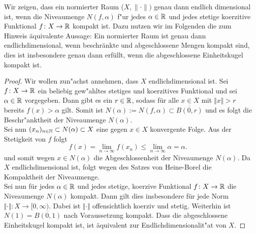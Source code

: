 
Wir zeigen, dass ein normierter Raum ($X, \lVert\cdot\rVert)$ genau dann endlich
dimensional ist, wenn die Niveaumenge
$N(f,\alpha)$ f"ur jedes $\alpha\in\mathbb{R}$ und
jedes stetige koerzitive Funktional
$f\colon X\to\mathbb{R}$ kompakt ist. Dazu
nutzen wir im Folgenden die zum Hinweis äquivalente Aussage: Ein normierter Raum ist genau dann endlichdimensional, wenn beschränkte und abgeschlossene Mengen kompakt sind,
dies ist insbesondere genau dann erfüllt, wenn die abgeschlossene Einheitskugel kompakt ist.

\begin{proof}
Wir wollen zun"achst annehmen, dass $X$ endlichdimensional ist. Sei $f\colon X\to\mathbb{R}$
ein beliebig gew"ahltes stetiges und koerzitives Funktional und sei $\alpha\in\mathbb{R}$
vorgegeben.
 Dann gibt es ein
 $r\in\mathbb{R}$, sodass für alle $x\in X$ mit $\Vert x\Vert>r$ bereits $f(x)>\alpha$ gilt. Somit ist $N(\alpha):=N(f,\alpha) \subset \overline{B(0,r)}$ und es folgt die
 Beschr"anktheit der Niveaumenge $N(\alpha)$.\\

 Sei nun $(x_n)_{n\in\mathbb{N}}\subset N(\alpha)\subset X$ eine gegen $x\in X$ konvergente Folge. Aus der Stetigkeit von $f$ folgt
 \begin{displaymath}
  f(x)=\lim_{n\to\infty} f(x_n)  \le \lim_{n\to\infty} \alpha =\alpha.
 \end{displaymath}
und somit wegen $x\in N(\alpha)$ die Abgeschlossenheit der Niveaumenge $N(\alpha)$. Da $X$ endlichdimensional ist,
folgt wegen des Satzes von Heine-Borel die
Kompaktheit der Niveaumenge.\\

Sei nun für jedes $\alpha\in \mathbb{R}$ und jedes stetige, koerzive Funktional $f\colon X\to\mathbb{R}$ die Niveaumenge $N(\alpha)$ kompakt. Dann gilt
dies insbesondere für jede Norm $\Vert\cdot\Vert: X\to [0,\infty)$.
Dabei ist $\Vert\cdot\Vert$ offensichtlich koerziv und stetig. Weiterhin ist $N(1)=\overline{B(0,1)}$ nach Voraussetzung kompakt.
Dass die abgeschlossene Einheitskugel kompakt ist, ist äquivalent zur Endlichdimensionalit"at von $X$.
\end{proof}
